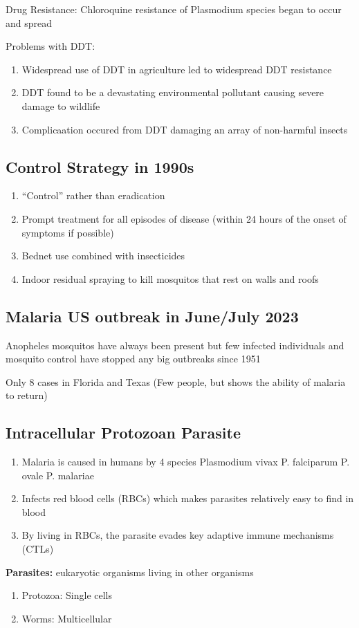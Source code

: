 \documentclass{notes}
\begin{document}
Drug Resistance: Chloroquine resistance of Plasmodium species began to occur and spread

Problems with DDT:
\begin{enumerate}
    \item Widespread use of DDT in agriculture led to widespread DDT resistance
    \item DDT found to be a devastating environmental pollutant causing severe damage to wildlife
    \item Complicaation occured from DDT damaging an array of non-harmful insects
\end{enumerate}

\subsection*{Control Strategy in 1990s}

\begin{enumerate}
    \item ``Control'' rather than eradication
    \item Prompt treatment for all episodes of disease (within 24 hours of the onset of symptoms if possible)
    \item Bednet use combined with insecticides
    \item Indoor residual spraying to kill mosquitos that rest on walls and roofs
\end{enumerate}

\subsection*{Malaria US outbreak in June/July 2023}
Anopheles mosquitos have always been present but few infected individuals and mosquito control have stopped any big outbreaks since 1951

Only 8 cases in Florida and Texas (Few people, but shows the ability of malaria to return)

\subsection*{Intracellular Protozoan Parasite}
\begin{enumerate}
    \item Malaria is caused in humans by 4 species
    \subitem Plasmodium vivax
    \subitem P. falciparum
    \subitem P. ovale
    \subitem P. malariae
    \item Infects red blood cells (RBCs) which makes parasites relatively easy to find in blood
    \item By living in RBCs, the parasite evades key adaptive immune mechanisms (CTLs)
\end{enumerate}
\textbf{Parasites:} eukaryotic organisms living in other organisms
\begin{enumerate}
    \item Protozoa: Single cells
    \item Worms: Multicellular
\end{enumerate}
\end{document}
